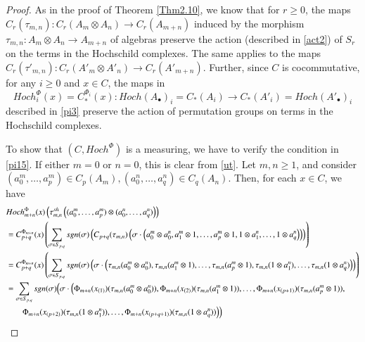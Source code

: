 \documentclass[10pt, colorlinks]{article}
\numberwithin{equation}{section} \DeclareMathSizes{2}{10}{12}{13}
\begin{document}
\begin{proof} 
As in the proof of Theorem \ref{Thm2.10}, we know that for $r\geq 0$, the maps $C_r(\tau_{m,n}):C_r(A_m  \otimes A_n)\longrightarrow C_r(A_{m+n})$ induced by the morphism 
    $\tau_{m,n}:A_m\otimes A_n\longrightarrow A_{m+n}$ of algebras  preserve the action (described in \eqref{act2}) of $S_r$ on the terms in the Hochschild complexes. The same applies to the  maps $C_r(\tau'_{m,n}):C_r(A'_m  \otimes A'_n)\longrightarrow C_r(A'_{m+n})$. 
    Further, since $C$ is cocommutative, for any $i\geq 0$ and $x\in C$, the maps  in
\begin{equation}
Hoch^\Phi_{i}(x)=C^{\Phi_i}_*(x):Hoch(A_\bullet)_i=C_*(A_i)\longrightarrow C_*(A'_i)=Hoch(A'_\bullet)_i
\end{equation} described in \eqref{pi3} preserve the action of permutation groups on terms in the Hochschild complexes.  
      
     \smallskip To show that  $(C,Hoch^\Phi)$ is a measuring, we have to verify the condition in \eqref{pi15}. If either $m=0$ or $n=0$, this is clear from \eqref{ut}. Let $m,n\geq 1$, and consider $(a_0^m,\ldots, a_p^m)\in C_p(A_m),(a^n_0,\ldots, a^n_q)\in C_q(A_n)$. Then, for each $x\in C$, we have
   \begin{align}
       &Hoch^\Phi_{m+n}(x)\left(\tau^{sh}_{m,n}\left((a_0^m,\ldots, a_p^m)\otimes (a_0^n,\ldots, a_q^n)\right)\right)\notag\\
       &=C^{\Phi_{m+n}}_{p+q}(x)\left(\sum_{\sigma\in S_{p,q}}sgn(\sigma)\left(C_{p+q}(\tau_{m,n})\left(\sigma\cdot\left(a_0^m\otimes a_0^n,a_1^m\otimes1,\ldots,a_p^m\otimes 1,1\otimes a_1^n,\ldots ,1\otimes a_q^n\right)\right)\right)\right)\notag\\
       &=C^{\Phi_{m+n}}_{p+q}(x)\left(\sum_{\sigma\in S_{p,q}}sgn(\sigma)\left(\sigma\cdot\left(\tau_{m,n}(a_0^m\otimes a_0^n),\tau_{m,n}(a_1^m\otimes1),\ldots,\tau_{m,n}(a_p^m\otimes 1),\tau_{m,n}(1\otimes a_1^n),\ldots ,\tau_{m,n}(1\otimes a_q^n)\right)\right)\right)\notag\\
       &=\sum_{\sigma\in S_{p,q}}sgn(\sigma)\Big(\sigma\cdot\Big(\Phi_{m+n}(x_{(1)})(\tau_{m,n}(a^m_0\otimes a_0^n)),\Phi_{m+n}(x_{(2)})(\tau_{m,n}(a_1^m\otimes1)),\ldots,\Phi_{m+n}(x_{(p+1)})(\tau_{m,n}(a_p^m\otimes 1)),\notag\\
       &\qquad\Phi_{m+n}(x_{(p+2)})(\tau_{m,n}(1\otimes a_1^n)),\ldots ,\Phi_{m+n}(x_{(p+q+1)})(\tau_{m,n}(1\otimes a_q^n))\Big)\Big)\notag
       \end{align}


\end{proof}
\end{document}
